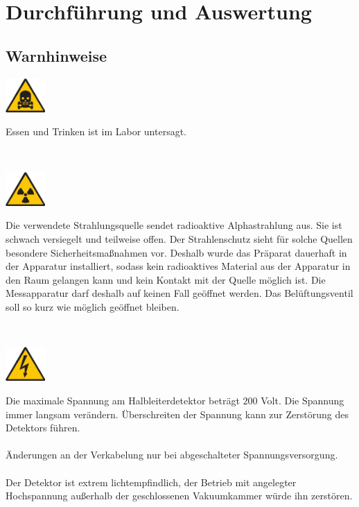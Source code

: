 \clearpage
\section{Durchführung und Auswertung}
%
\subsection{Warnhinweise}\label{sec:warnhinweise}
%
\begin{minipage}[c]{.15\linewidth}
	\includegraphics[width=1.5cm]{img/toxic}
\end{minipage}
\begin{minipage}[t]{.85\linewidth}
	Essen und Trinken ist im Labor untersagt.
\end{minipage}\vspace{1em}\\ 
\begin{minipage}[c]{.15\linewidth}
	\includegraphics[width=1.5cm]{img/radioactive}
\end{minipage}
\begin{minipage}[t]{.85\linewidth}
	Die verwendete Strahlungsquelle sendet radioaktive Alphastrahlung aus. Sie ist schwach versiegelt und teilweise offen. Der Strahlenschutz sieht für solche Quellen besondere Sicherheitsmaßnahmen vor. Deshalb wurde das Präparat dauerhaft in der Apparatur installiert, sodass kein radioaktives Material aus der Apparatur in den Raum gelangen kann und kein Kontakt mit der Quelle möglich ist. Die Messapparatur darf deshalb auf keinen Fall geöffnet werden. Das Belüftungsventil soll so kurz wie möglich geöffnet bleiben.
\end{minipage}\vspace{1em}\\ 
\begin{minipage}[c]{.15\linewidth}
	\includegraphics[width=1.5cm]{img/electric}
\end{minipage}
\begin{minipage}[t]{.85\linewidth}
	Die maximale Spannung am Halbleiterdetektor beträgt $200$ Volt. Die Spannung immer langsam verändern. Überschreiten der Spannung kann zur Zerstörung des Detektors führen.
	\\ \\
	Änderungen an der Verkabelung nur bei abgeschalteter Spannungsversorgung.
	\\ \\
	Der Detektor ist extrem lichtempfindlich, der Betrieb mit angelegter Hochspannung außerhalb der geschlossenen Vakuumkammer würde ihn zerstören.
\end{minipage}\vspace{1em}\\ 

